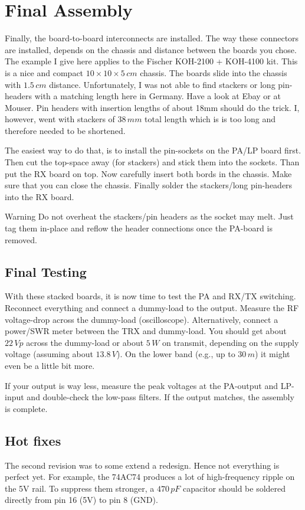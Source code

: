 \documentclass[10pt, a4paper]{scrartcl}
\newenvironment{warning}{\begin{bclogo}[couleur=red!30,arrondi=.1,logo=\bcattention,ombre=true]{Warning}}{\end{bclogo}}
\begin{document}
\clearpage
\section{Final Assembly} \label{sec:box}
Finally, the board-to-board interconnects are installed. The way these connectors are installed, depends on the chassis and distance between the boards you chose. The example I give here applies to the Fischer KOH-2100 + KOH-4100 kit. This is a nice and compact $10 \times 10 \times 5\,cm$ chassis. The boards slide into the chassis with $1.5\,cm$ distance. Unfortunately, I was not able to find stackers or long pin-headers with a matching length here in Germany. Have a look at Ebay or at Mouser. Pin headers with insertion lengths of about 18mm should do the trick. I, however, went with stackers of $38\,mm$ total length which is is too long and therefore needed to be shortened.

The easiest way to do that, is to install the pin-sockets on the PA/LP board first. Then cut the top-space away (for stackers)  and stick them into the sockets. Than put the RX board on top. Now carefully insert both bords in the chassis. Make sure that you can close the chassis. Finally solder the stackers/long pin-headers into the RX board. 

\begin{warning}
Do not overheat the stackers/pin headers as the socket may melt. Just tag them in-place and reflow the header connections once the PA-board is removed.
\end{warning}

\subsection{Final Testing}
With these stacked boards, it is now time to test the PA and RX/TX switching. Reconnect everything and connect a dummy-load to the output. Measure the RF voltage-drop across the dummy-load (oscilloscope). Alternatively, connect a power/SWR meter between the TRX and dummy-load. You should get about $22\,Vp$ across the dummy-load or about $5\,W$ on transmit, depending on the supply voltage (assuming about $13.8\,V$). On the lower band (e.g., up to $30\,m$) it might even be a little bit more. 

If your output is way less, measure the peak voltages at the PA-output and LP-input and double-check the low-pass filters. If the output matches, the assembly is complete. 

\subsection{Hot fixes}
The second revision was to some extend a redesign. Hence not everything is perfect yet. For example, the 74AC74 produces a lot of high-frequency ripple on the 5V rail. To suppress them stronger, a $470\,pF$ capacitor should be soldered directly from pin 16 (5V) to pin 8 (GND).  
\end{document}
